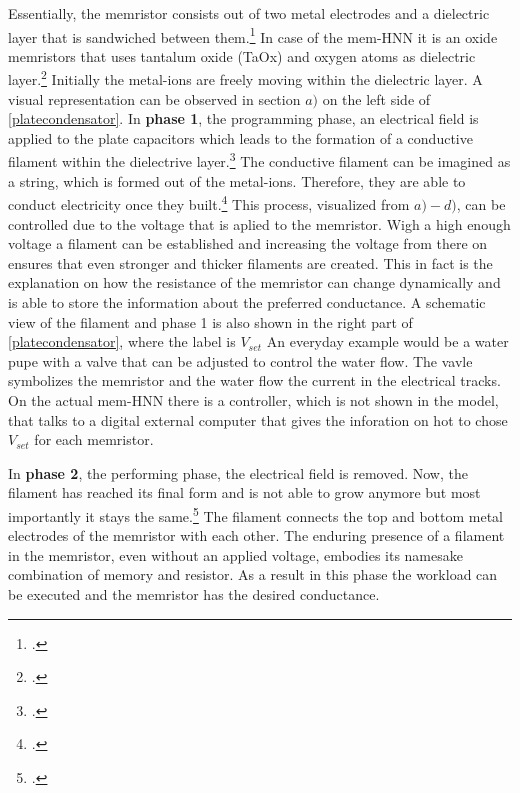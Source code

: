 Essentially, the memristor consists out of two metal electrodes and a dielectric layer that is sandwiched between them.\footcite[cf.][1]{changDirectObservationDualFilament2017}
In case of the \ac{mem-HNN} it is an oxide memristors that uses tantalum oxide (TaOx) and oxygen atoms as dielectric layer.\footcite[cf.][412]{caiPowerefficientCombinatorialOptimization2020}
Initially the metal-ions are freely moving within the dielectric layer. 
A visual representation can be observed in section \(a)\) on the left side of \ref{platecondensator}.
In \textbf{phase 1}, the programming phase, an electrical field is applied to the plate capacitors which leads to the formation of a conductive filament within the dielectrive layer.\footcite[cf.][3]{changDirectObservationDualFilament2017}
The conductive filament can be imagined as a string, which is formed out of the metal-ions.
Therefore, they are able to conduct electricity once they built.\footcite[cf.][5]{changDirectObservationDualFilament2017}
This process, visualized from \(a)-d)\), can be controlled due to the voltage that is aplied to the memristor.
Wigh a high enough voltage a filament can be established and increasing the voltage from there on ensures that even stronger and thicker filaments are created.
This in fact is the explanation on how the resistance of the memristor can change dynamically and is able to store the information
about the preferred conductance. A schematic view of the filament and phase 1 is also shown in the right part of \ref{platecondensator}, where the label is \(V_{set}\) 
An everyday example would be a water pupe with a valve that can be adjusted to control the water flow. 
The vavle symbolizes the memristor and the water flow the current in the electrical tracks.
On the actual \ac{mem-HNN} there is a controller, which is not shown in the model, that talks to a digital external computer that gives the inforation on hot to chose \(V_{set}\) for each memristor.

In \textbf{phase 2}, the performing phase, the electrical field is removed.
Now, the filament has reached its final form and is not able to grow anymore but most importantly it stays the same.\footcite[cf.][1-2]{sungPerspectiveReviewMemristive2018}
The filament connects the top and bottom metal electrodes of the memristor with each other.
The enduring presence of a filament in the memristor, even without an applied voltage, embodies its namesake combination of memory and resistor.
As a result in this phase the workload can be executed and the memristor has the desired conductance.

